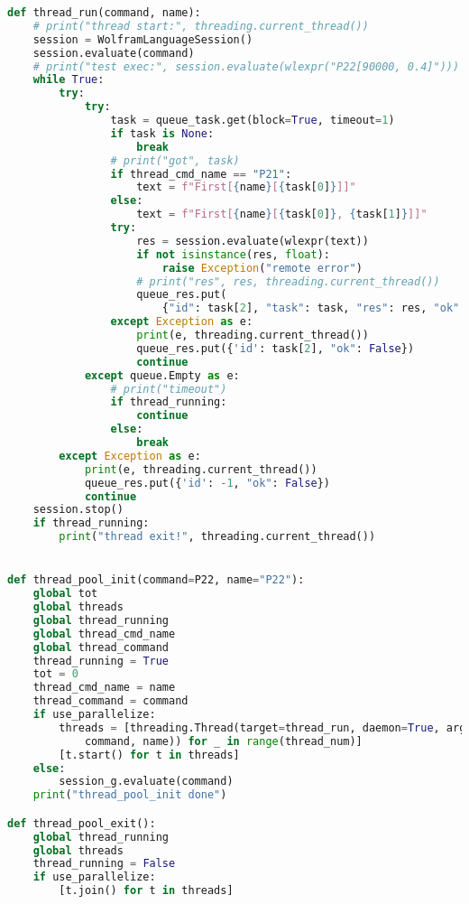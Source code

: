 \begin{lstlisting}[language=Python,breaklines=true]
def thread_run(command, name):
    # print("thread start:", threading.current_thread())
    session = WolframLanguageSession()
    session.evaluate(command)
    # print("test exec:", session.evaluate(wlexpr("P22[90000, 0.4]")))
    while True:
        try:
            try:
                task = queue_task.get(block=True, timeout=1)
                if task is None:
                    break
                # print("got", task)
                if thread_cmd_name == "P21":
                    text = f"First[{name}[{task[0]}]]"
                else:
                    text = f"First[{name}[{task[0]}, {task[1]}]]"
                try:
                    res = session.evaluate(wlexpr(text))
                    if not isinstance(res, float):
                        raise Exception("remote error")
                    # print("res", res, threading.current_thread())
                    queue_res.put(
                        {"id": task[2], "task": task, "res": res, "ok": True})
                except Exception as e:
                    print(e, threading.current_thread())
                    queue_res.put({'id': task[2], "ok": False})
                    continue
            except queue.Empty as e:
                # print("timeout")
                if thread_running:
                    continue
                else:
                    break
        except Exception as e:
            print(e, threading.current_thread())
            queue_res.put({'id': -1, "ok": False})
            continue
    session.stop()
    if thread_running:
        print("thread exit!", threading.current_thread())


def thread_pool_init(command=P22, name="P22"):
    global tot
    global threads
    global thread_running
    global thread_cmd_name
    global thread_command
    thread_running = True
    tot = 0
    thread_cmd_name = name
    thread_command = command
    if use_parallelize:
        threads = [threading.Thread(target=thread_run, daemon=True, args=(
            command, name)) for _ in range(thread_num)]
        [t.start() for t in threads]
    else:
        session_g.evaluate(command)
    print("thread_pool_init done")

def thread_pool_exit():
    global thread_running
    global threads
    thread_running = False
    if use_parallelize:
        [t.join() for t in threads]



\end{lstlisting}
